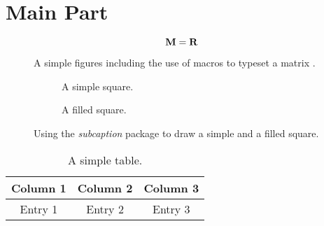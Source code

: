 
\section{Main Part}

\lipsum[13-15]

\begin{equation}
    \mathbf{M} = \mathbf{R}
\end{equation}

\begin{figure}[t]
    \centering
    
    \caption{A simple figures including the use of macros to typeset a matrix \Mmat.}
    \label{fig:matrix}
\end{figure}

\lipsum[16-17]

\begin{figure}[t]
    \centering
    \begin{subfigure}[b]{0.49\textwidth}
        \centering
        
        \caption{A simple square.}
        \label{fig:squareSimple}
    \end{subfigure}
    \begin{subfigure}[b]{0.49\textwidth}
        \centering
        
        \caption{A filled square.}
        \label{fig:squareFilled}
    \end{subfigure}
    \caption{Using the \emph{subcaption} package to draw a simple and a filled square.}
    \label{fig:squares}
\end{figure}

\lipsum[18-19]

\begin{table}[t]
    \centering
    \begin{tabular}{ccc}\toprule
        Column 1 & Column 2 & Column 3\\\bottomrule\toprule
        Entry 1  & Entry 2  & Entry 3 \\\bottomrule
    \end{tabular}
    \caption{A simple table.}
    \label{tab:table}
\end{table}

\lipsum[20-21]

